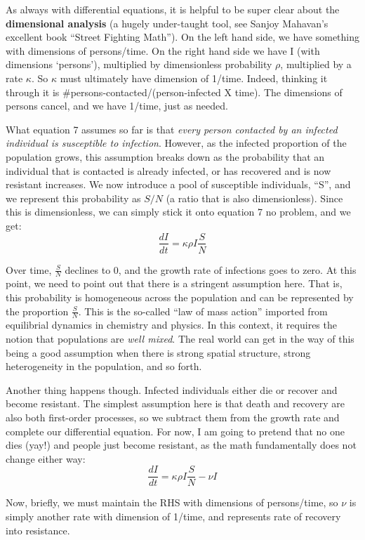 \documentclass[]{article}
\begin{document}
As always with differential equations, it is helpful to be super clear
about the \textbf{dimensional analysis} (a hugely under-taught tool, see
Sanjoy Mahavan's excellent book ``Street Fighting Math''). On the left
hand side, we have something with dimensions of persons/time. On the
right hand side we have I (with dimensions `persons'), multiplied by
dimensionless probability \(\rho\), multiplied by a rate \(\kappa\). So
\(\kappa\) must ultimately have dimension of 1/time. Indeed, thinking it
through it is \#persons-contacted/(person-infected X time). The
dimensions of persons cancel, and we have 1/time, just as needed.

What equation 7 assumes so far is that \emph{every person contacted by
an infected individual is susceptible to infection}. However, as the
infected proportion of the population grows, this assumption breaks down
as the probability that an individual that is contacted is already
infected, or has recovered and is now resistant increases. We now
introduce a pool of susceptible individuals, ``S'', and we represent
this probability as \(S/N\) (a ratio that is also dimensionless). Since
this is dimensionless, we can simply stick it onto equation 7 no
problem, and we get:
\[\tag{8} \frac{dI}{dt} = \kappa \rho I \frac{S}{N}\]

Over time, \(\frac {S}{N}\) declines to 0, and the growth rate of
infections goes to zero. At this point, we need to point out that there
is a stringent assumption here. That is, this probability is homogeneous
across the population and can be represented by the proportion
\(\frac{S}{N}\). This is the so-called ``law of mass action'' imported
from equilibrial dynamics in chemistry and physics. In this context, it
requires the notion that populations are \emph{well mixed}. The real
world can get in the way of this being a good assumption when there is
strong spatial structure, strong heterogeneity in the population, and so
forth.

Another thing happens though. Infected individuals either die or recover
and become resistant. The simplest assumption here is that death and
recovery are also both first-order processes, so we subtract them from
the growth rate and complete our differential equation. For now, I am
going to pretend that no one dies (yay!) and people just become
resistant, as the math fundamentally does not change either way:
\[\tag{9} \frac {dI}{dt} = \kappa \rho I \frac{S}{N} - \nu I\]

Now, briefly, we must maintain the RHS with dimensions of persons/time,
so \(\nu\) is simply another rate with dimension of 1/time, and
represents rate of recovery into resistance.
\end{document}

